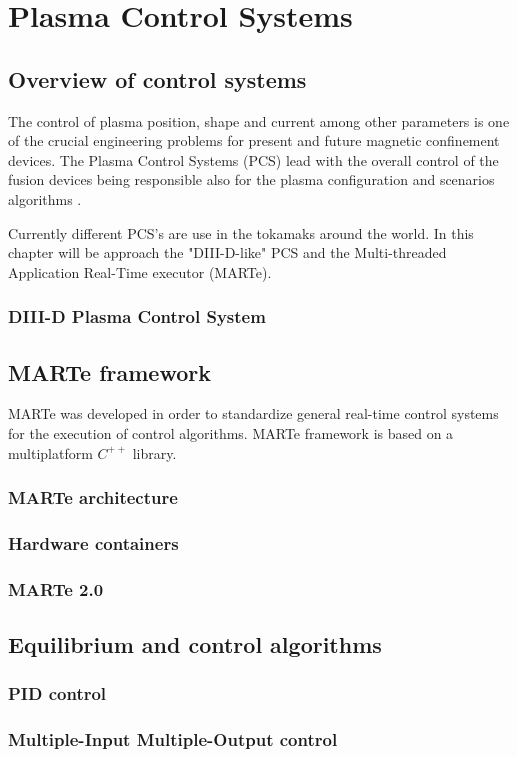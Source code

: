 \chapter{Plasma Control Systems}

\section{Overview of control systems}
The control of  plasma position, shape and current among other parameters is one of the crucial engineering problems for present and future magnetic confinement devices. The Plasma Control Systems (PCS) lead with the overall control of the fusion devices  being responsible also for the  plasma configuration and scenarios algorithms \cite[Chapter~8]{PCS_2018}. 
\hfil

Currently different PCS's are use in the tokamaks around the world. In this chapter will be approach the "DIII-D-like" PCS and the Multi-threaded Application Real-Time executor (MARTe).

\subsection{DIII-D Plasma Control System}  

\cite{DIIDcontrol}

\section{MARTe framework}

MARTe was developed in order to standardize general real-time control systems for the execution of control algorithms. MARTe framework is based on a multiplatform $C^{++}$ library. \cite{Neto2011} 

\subsection{MARTe architecture }
\subsection{Hardware containers}
\subsection{MARTe 2.0}
\section{Equilibrium and control algorithms} 
\subsection{PID control}
\subsection{Multiple-Input Multiple-Output control}